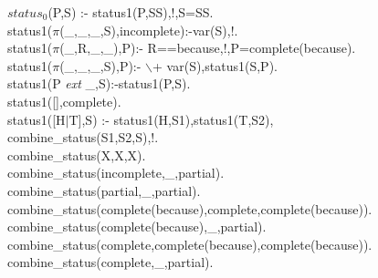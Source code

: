 \documentclass[11pt]{report}
\makeatletter
\newcommand{\ulinv}[1]{\index{#1@\texttt{#1}}}
\makeatother
\begin{document}
 \small
 \ulinv{status0}
\begin{sf}\begin{tabbing}
$status_0$(P,S) :- status1(P,SS),!,S=SS.\\[-0.15ex]
status1($\pi$(\_\hspace{0.1em},\_\hspace{0.1em},\_\hspace{0.1em},S),incomplete):-var(S),!.\\[-0.15ex]
status1($\pi$(\_\hspace{0.1em},R,\_\hspace{0.1em},\_\hspace{0.1em}),P):- R==because,!,P=complete(because).\\[-0.15ex]
status1($\pi$(\_\hspace{0.1em},\_\hspace{0.1em},\_\hspace{0.1em},S),P):- $\backslash$+ var(S),status1(S,P).\\[-0.15ex]
status1(P \mbox{\it ext} \_\hspace{0.1em},S):-status1(P,S).\\[-0.15ex]
status1([],complete).\\[-0.15ex]
status1([H$\mid$T],S) :- status1(H,S1),status1(T,S2),\\[-0.15ex]
\hspace{10em}combine\_\hspace{0.1em}status(S1,S2,S),!.\\[-0.15ex]
combine\_\hspace{0.1em}status(X,X,X).\\[-0.15ex]
combine\_\hspace{0.1em}status(incomplete,\_\hspace{0.1em},partial).\\[-0.15ex]
combine\_\hspace{0.1em}status(partial,\_\hspace{0.1em},partial).\\[-0.15ex]
combine\_\hspace{0.1em}status(complete(because),complete,complete(because)).\\[-0.15ex]
combine\_\hspace{0.1em}status(complete(because),\_\hspace{0.1em},partial).\\[-0.15ex]
combine\_\hspace{0.1em}status(complete,complete(because),complete(because)).\\[-0.15ex]
combine\_\hspace{0.1em}status(complete,\_\hspace{0.1em},partial).\\[-0.7ex]

\end{tabbing}\end{sf}
\end{document}
